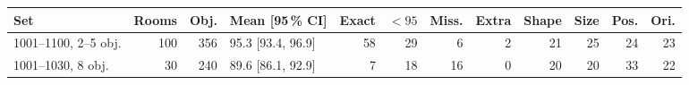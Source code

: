 \begin{tabular}{@{}lrrlrrrrrrrr@{}}
\toprule
Set & Rooms & Obj. & Mean [95\,\% CI] & Exact & $<95$ & Miss. & Extra & Shape & Size & Pos. & Ori. \\
\midrule
1001--1100, 2--5 obj. & 100 & 356 & 95.3 [93.4, 96.9] & 58 & 29 & 6 & 2 & 21 & 25 & 24 & 23 \\
1001--1030, 8 obj. & 30 & 240 & 89.6 [86.1, 92.9] & 7 & 18 & 16 & 0 & 20 & 20 & 33 & 22 \\
\bottomrule
\end{tabular}
